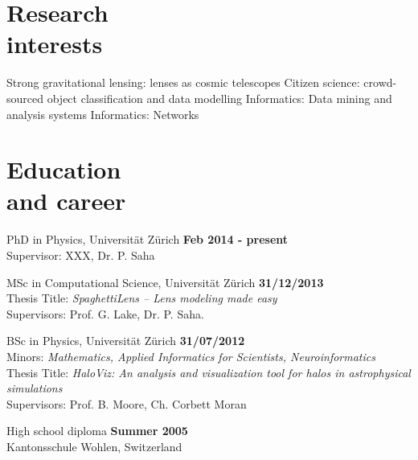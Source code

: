 \documentclass[margin,line]{resume}
\def\tb{\textbullet\;}
\begin{document}
\begin{resume}
\section{\mysidestyle Research\\interests}

  \tb Strong gravitational lensing: lenses as cosmic telescopes
  \tb Citizen science: crowd-sourced object classification and data modelling
  \tb Informatics: Data mining and analysis systems
  \tb Informatics: Networks


\section{\mysidestyle Education\\ and career}

\begin{list2}

  \item  PhD in Physics, Universität Zürich
  \hfill {\bf Feb 2014 - present}\\
  {\small Supervisor: XXX, Dr. P. Saha}

  \item MSc in Computational Science, Universität Zürich
  \hfill {\bf 31/12/2013}\\
  {\small Thesis Title: \emph{SpaghettiLens -- Lens modeling made easy} \\
  Supervisors: Prof. G. Lake, Dr. P. Saha}.

  \item BSc in Physics, Universität Zürich
  \hfill {\bf 31/07/2012}\\
  {\small Minors: \emph{Mathematics, Applied Informatics for Scientists, Neuroinformatics}\\
  Thesis Title: \emph{HaloViz: An analysis and visualization tool for halos in astrophysical simulations} \\
  Supervisors: Prof. B. Moore, Ch. Corbett Moran}

  \item High school diploma \hfill {\bf Summer 2005}\\
  Kantonsschule Wohlen, Switzerland

\end{list2}




\end{resume}
\end{document}
